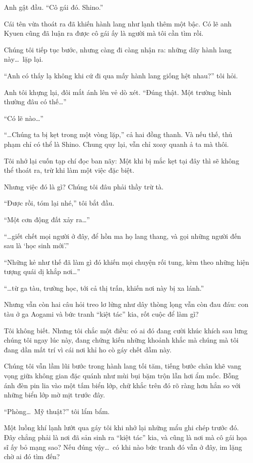 \documentclass[../main.tex]{subfiles}
\begin{document}
Anh gật đầu. ``Cô gái đó. Shino.''

Cái tên vừa thoát ra đã khiến hành lang như lạnh thêm một bậc. Có lẽ anh Kyuen cũng đã luận ra được cô gái ấy là người mà tôi cần tìm rồi.

Chúng tôi tiếp tục bước, nhưng càng đi càng nhận ra: những dãy hành lang này\dots\ lặp lại.

``Anh có thấy lạ không khi cứ đi qua mấy hành lang giống hệt nhau?'' tôi hỏi.

Anh tôi khựng lại, đôi mắt ánh lên vẻ dò xét. ``Đúng thật. Một trường bình thường đâu có thế\dots''

``Có lẽ nào\dots''

``\dots Chúng ta bị kẹt trong một vòng lặp,'' cả hai đồng thanh. Và nếu thế, thủ phạm chỉ có thể là Shino. Chung quy lại, vẫn chỉ xoay quanh ả ta mà thôi.

Tôi nhớ lại cuốn tạp chí đọc ban nãy: Một khi bị mắc kẹt tại đây thì sẽ không thể thoát ra, trừ khi làm một việc đặc biệt.

Nhưng việc đó là gì? Chúng tôi đâu phải thầy trừ tà.

``Được rồi, tóm lại nhé,'' tôi bắt đầu.

``Một cơn động đất xảy ra\dots''

``\dots giết chết mọi người ở đây, để hồn ma họ lang thang, và gọi những người đến sau là `học sinh mới'.''

``Những kẻ như thế đã làm gì đó khiến mọi chuyện rối tung, kèm theo những hiện tượng quái dị khắp nơi\dots''

``\dots từ ga tàu, trường học, tới cả thị trấn, khiến nơi này bị xa lánh.''

Nhưng vẫn còn hai câu hỏi treo lơ lửng như dây thòng lọng vẫn còn đau đáu: con tàu ở ga Aogami và bức tranh ``kiệt tác'' kia, rốt cuộc để làm gì?

Tôi không biết. Nhưng tôi chắc một điều: có ai đó đang cười khúc khích sau lưng chúng tôi ngay lúc này, đang chứng kiến những khoảnh khắc mà chúng mà tôi đang dần mất trí vì cái nơi khỉ ho cò gáy chết dẫm này.

Chúng tôi vẫn lầm lũi bước trong hành lang tối tăm, tiếng bước chân khẽ vang vọng giữa không gian đặc quánh như mùi bụi bặm trộn lẫn hơi ẩm mốc. Bỗng ánh đèn pin lia vào một tấm biển lớp, chữ khắc trên đó rõ ràng hơn hẳn so với những biển lớp mờ mịt trước đây.

``Phòng\dots\ Mỹ thuật?'' tôi lẩm bẩm.

Một luồng khí lạnh lướt qua gáy tôi khi nhớ lại những mẩu ghi chép trước đó. Đây chẳng phải là nơi đã sản sinh ra ``kiệt tác'' kia, và cũng là nơi mà cô gái họa sĩ ấy bỏ mạng sao? Nếu đúng vậy\dots\ có khi nào bức tranh đó vẫn ở đây, im lặng chờ ai đó tìm đến?
\end{document}
